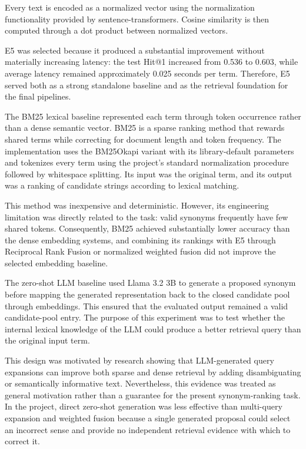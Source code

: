 Every text is encoded as a normalized vector using the normalization functionality provided by sentence-transformers. Cosine similarity is then computed through a dot product between normalized vectors.

E5 was selected because it produced a substantial improvement without materially increasing latency: the test Hit@1 increased from 0.536 to 0.603, while average latency remained approximately 0.025 seconds per term. Therefore, E5 served both as a strong standalone baseline and as the retrieval foundation for the final pipelines.

The BM25 lexical baseline represented each term through token occurrence rather than a dense semantic vector. BM25 is a sparse ranking method that rewards shared terms while correcting for document length and token frequency. The implementation uses the BM25Okapi variant with its library-default parameters and tokenizes every term using the project's standard normalization procedure followed by whitespace splitting. Its input was the original term, and its output was a ranking of candidate strings according to lexical matching.

This method was inexpensive and deterministic. However, its engineering limitation was directly related to the task: valid synonyms frequently have few shared tokens. Consequently, BM25 achieved substantially lower accuracy than the dense embedding systems, and combining its rankings with E5 through Reciprocal Rank Fusion or normalized weighted fusion did not improve the selected embedding baseline.

The zero-shot LLM baseline used Llama 3.2 3B to generate a proposed synonym before mapping the generated representation back to the closed candidate pool through embeddings. This ensured that the evaluated output remained a valid candidate-pool entry. The purpose of this experiment was to test whether the internal lexical knowledge of the LLM could produce a better retrieval query than the original input term.

This design was motivated by research showing that LLM-generated query expansions can improve both sparse and dense retrieval by adding disambiguating or semantically informative text. Nevertheless, this evidence was treated as general motivation rather than a guarantee for the present synonym-ranking task. In the project, direct zero-shot generation was less effective than multi-query expansion and weighted fusion because a single generated proposal could select an incorrect sense and provide no independent retrieval evidence with which to correct it.

